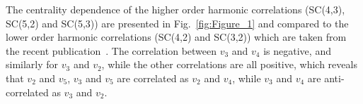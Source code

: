  


The centrality dependence of the higher order harmonic correlations (SC(4,3), SC(5,2) and SC(5,3)) are presented in Fig.~\ref{fig:Figure_1} and compared to the lower order harmonic correlations (SC(4,2) and SC(3,2)) which are taken from the recent publication~\cite{ALICE:2016kpq}. The correlation between $v_3$ and $v_4$ is negative, and similarly for $v_3$ and $v_2$, while the other correlations are all positive, which reveals that $v_2$ and $v_5$, $v_3$ and $v_5$ are correlated as $v_2$ and $v_4$, while $v_3$ and $v_4$ are anti-correlated as $v_3$ and $v_2$.

